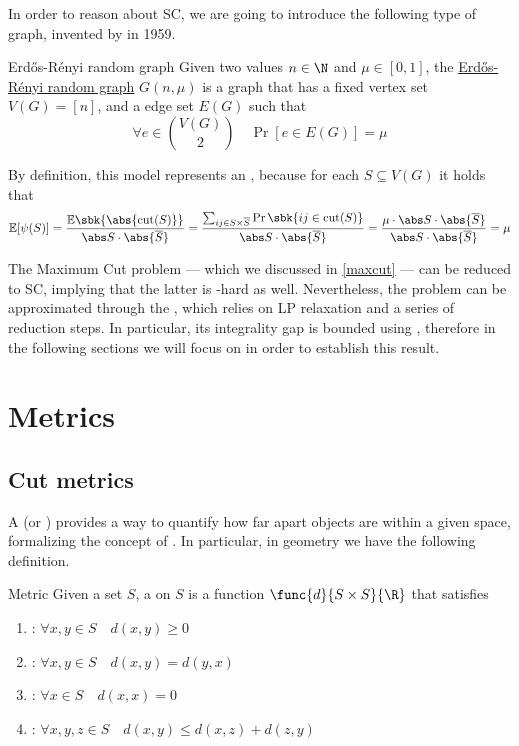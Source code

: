 \documentclass[a4paper, 12pt]{report}
\begin{document}
    In order to reason about SC, we are going to introduce the following type of graph, invented by \textcite{erdos} in 1959.

    \begin{frameddefn}{Erdős-Rényi random graph}
        Given two values $n \in \N$ and $\mu \in [0, 1]$, the \href{https://en.wikipedia.org/wiki/Erd%C5%91s%E2%80%93R%C3%A9nyi_model}{Erdős-Rényi random graph} $G(n, \mu)$ is a graph that has a fixed vertex set $V(G) = [n]$, and a \tit{probabilistic} edge set $E(G)$ such that $$\forall e \in \binom{V(G)}{2} \quad \Pr[e \in E(G)] = \mu$$
    \end{frameddefn}

    By definition, this model represents an , because for each $S \subseteq V(G)$ it holds that $$ \mathbb E[\psi(S)] = \dfrac{\mathbb E\sbk{\abs{\mathrm{cut}(S)}}}{\abs S \cdot \abs{\overline S}} = \dfrac{\sum_{ij \in S \times \overline S}{\Pr \sbk{ij \in \mathrm{cut}(S)}}}{\abs S \cdot  \abs{\overline S}}= \dfrac{\mu \cdot \abs S \cdot \abs{\overline S}}{\abs S \cdot \abs{\overline S}} = \mu$$

    The Maximum Cut problem --- which we discussed in \cref{maxcut} --- can be reduced to SC, implying that the latter is \NPclass-hard as well. Nevertheless, the problem can be approximated through the  \cite{leightonrao}, which relies on LP relaxation and a series of reduction steps. In particular, its integrality gap is bounded using , therefore in the following sections we will focus on  in order to establish this result.

    \section{Metrics}

    \subsection{Cut metrics}

    A  (or ) provides a way to quantify how far apart objects are within a given space, formalizing the concept of . In particular, in geometry we have the following definition.

    \begin{frameddefn}{Metric}
        Given a set $S$, a  on $S$ is a function $\func{d}{S \times S}{\R}$ that satisfies

        \begin{enumerate}
            \item {}: $\forall x, y \in S \quad d(x,y) \ge 0$
            \item {}: $\forall x, y \in S \quad d(x, y) = d(y, x)$
            \item {}: $\forall x \in S \quad d(x, x) = 0$
            \item {}: $\forall x, y, z \in S \quad d(x,y) \le d(x,z) + d(z, y)$
        \end{enumerate}
    \end{frameddefn}
\end{document}
